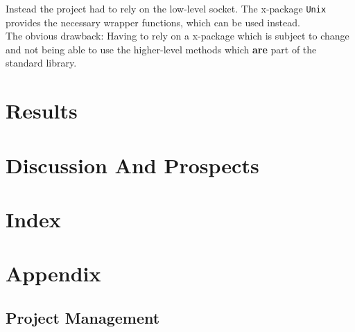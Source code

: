 \documentclass[10pt,a4paper,titlepage,twoside,english,final]{zhawreprt}
\begin{document}
Instead the project had to rely on the low-level \gls{socket}. The \gls{x-package} \texttt{Unix} provides the necessary wrapper functions, which can be used instead.\\
The obvious drawback: Having to rely on a \gls{x-package} which is subject to change and not being able to use the higher-level methods which \textbf{are} part of the standard library.



\chapter{Results}\label{chp:Results}

\chapter{Discussion And Prospects}\label{chp:DiscussionAndProspects}

\chapter{Index}\label{chp:Index}
\label{sec:Bibliography}
\newpage
\printglossary\label{sec:Glossary}
\newpage
\listoffigures\label{sec:ListOfFigures}
\newpage
\listoftables\label{sec:ListOfTables}
\newpage
\lstlistoflistings\label{sec:ListOfListings}
\newpage
\printglossary[title=SymbolGlossary,type=symbols]\label{sec:SymbolGlossary}
\newpage
\printglossary[title=Acronym Glossary,type=\acronymtype]\label{sec:AcronymGlossary}
\newpage
\printindex\label{sec:Index}

\appendix
\chapter{Appendix}\label{chp:Appendix}
\section{Project Management}\label{sec:ProjectManagement}
\end{document}
